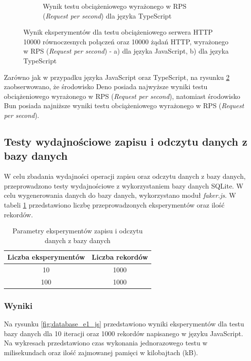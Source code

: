 \begin{figure}[H]
\begin{subfigure}[b]{0.42\textwidth}
    \caption{Wynik testu obciążeniowego wyrażonego w RPS (\textit{Request per second}) dla języka TypeScript}
    \label{fig:server_e3_ts}
  \end{subfigure}
  \caption{Wynik eksperymentów dla testu obciążeniowego serwera HTTP 10000 równoczesnych połączeń oraz 10000 żądań HTTP, wyrażonego w RPS (\textit{Request per second}) - a) dla języka JavaScript, b) dla języka TypeScript}
  \label{fig:server_e3}
\end{figure}

Zarówno jak w przypadku języka JavaScript oraz TypeScript, na rysunku \ref{fig:server_e3} zaobserwowano, że środowisko Deno posiada najwyższe wyniki testu obciążeniowego wyrażonego w RPS (\textit{Request per second}), natomiast środowisko Bun posiada najniższe wyniki testu obciążeniowego wyrażonego w RPS (\textit{Request per second}).

\subsection{Testy wydajnościowe zapisu i odczytu danych z bazy danych}
W celu zbadania wydajności operacji zapisu oraz odczytu danych z bazy danych, przeprowadzono testy wydajnościowe z wykorzystaniem bazy danych SQLite. W celu wygenerowania danych do bazy danych, wykorzystano moduł \textit{faker.js}. W tabeli \ref{tab:database_experiments} przedstawiono liczbę przeprowadzonych eksperymentów oraz ilość rekordów.

\begin{table}[H]
  \centering
  \caption{Parametry eksperymentów zapisu i odczytu danych z bazy danych}
  \begin{tabular}{|c|c|}
    \hline
    \textbf{Liczba eksperymentów} & \textbf{Liczba rekordów}\\ \hline
    10 & 1000 \\ \hline
    100 & 1000 \\ \hline
  \end{tabular}
  \label{tab:database_experiments}
\end{table}

\subsubsection{Wyniki}
Na rysunku \ref{fig:database_e1_js} przedstawiono wyniki eksperymentów dla testu bazy danych dla 10 iteracji oraz 1000 rekordów napisanego w języku JavaScript. Na wykresach przedstawiono czas wykonania jednorazowego testu w milisekundach oraz ilość zajmowanej pamięci w kilobajtach (kB).


